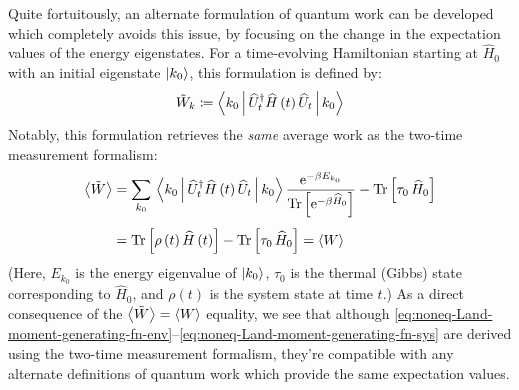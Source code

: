 \documentclass[preprints,article,accept,moreauthors,pdftex]{Definitions/mdpi}
\begin{document}
\begin{paracol}{2}
Quite fortuitously, an alternate formulation of quantum work can be developed \cite{DPZ16} which completely avoids this issue, by focusing on the change in the expectation values of the energy eigenstates. For a time-evolving Hamiltonian starting at $\widehat{H}_{0}$ with an initial eigenstate $\ket{k_{0}}$, this formulation is defined by:
\begin{equation}
    \label{eq:one-time-work}
    \Tilde{W}_{k} \coloneqq \Braket{k_{0}|\widehat{U}_{t}^{\dagger}\widehat{H}\left(t\right)\widehat{U}_{t}|k_{0}}
\end{equation}
Notably, this formulation retrieves the \emph{same} average work as the two-time measurement formalism:
\begin{equation}
    \label{eq:one-time-vs-two-time-avg-work}
    \begin{split}
        \left\langle\Tilde{W}\right\rangle &= \sum\limits_{k_{0}}\,\Braket{k_{0}|\widehat{U}_{t}^{\dagger}\widehat{H}\left(t\right)\widehat{U}_{t}|k_{0}}\frac{ \mathrm{e}^{-\beta E_{k_{0}}}}{\mathrm{Tr}\left[\mathrm{e}^{-\beta\widehat{H}_{0}}\right]} - \mathrm{Tr}\left[\tau_{0}\,\widehat{H}_{0}\right]\\[4pt]
        & = \mathrm{Tr}\left[\rho\left(t\right)\widehat{H}\left(t\right)\right] - \mathrm{Tr}\left[\tau_{0}\,\widehat{H}_{0}\right] = \left\langle W \right\rangle
    \end{split}
\end{equation}
(Here, $E_{k_{0}}$ is the energy eigenvalue of $\ket{k_{0}}$, $\tau_{0}$ is the thermal (Gibbs) state corresponding to $\widehat{H}_{0}$, and $\rho\left(t\right)$ is the system state at time $t$.) As a direct consequence of the $\left\langle\Tilde{W}\right\rangle =  \left\langle W \right\rangle$ equality, we see that although \eqref{eq:noneq-Land-moment-generating-fn-env}--\eqref{eq:noneq-Land-moment-generating-fn-sys} are derived using the two-time measurement formalism, they're compatible with any alternate definitions of quantum work which provide the same expectation values.



\end{paracol}
\end{document}
